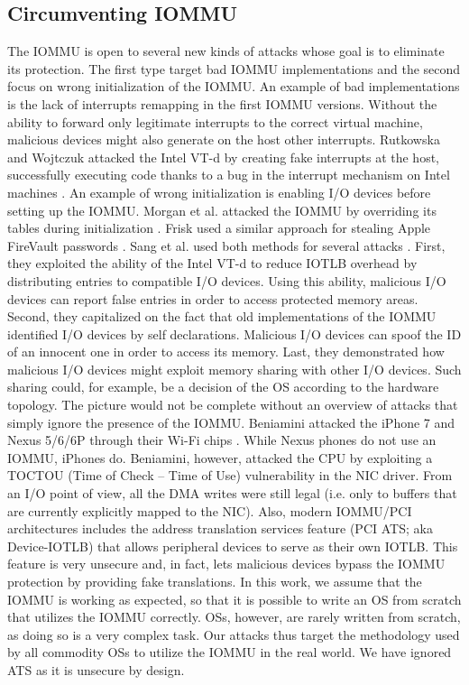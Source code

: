 \subsection{Circumventing IOMMU}
The IOMMU is open to several new kinds of attacks whose goal is to eliminate its protection. The first type target bad IOMMU implementations and the second focus on wrong initialization of the IOMMU. An example of bad implementations is the lack of interrupts remapping in the first IOMMU versions. Without the ability to forward only legitimate interrupts to the correct virtual machine, malicious devices might also generate on the host other interrupts. Rutkowska and Wojtczuk attacked the Intel VT-d by creating fake interrupts at the host, successfully executing code thanks to a bug in the interrupt mechanism on Intel machines \cite{WR11}. An example of wrong initialization is enabling I/O devices before setting up the IOMMU. Morgan et al. attacked the IOMMU by overriding its tables during initialization \cite{MANK16}. Frisk used a similar approach for stealing Apple FireVault passwords \cite{Cim16}. Sang et al. used both methods for several attacks \cite{SLND10}. First, they exploited the ability of the Intel VT-d to reduce IOTLB overhead by distributing entries to compatible I/O devices. Using this ability, malicious I/O devices can report false entries in order to access protected memory areas. Second, they capitalized on the fact that old implementations of the IOMMU identified I/O devices by self declarations. Malicious I/O devices can spoof the ID of an innocent one in order to access its memory. Last, they demonstrated how malicious I/O devices might exploit memory sharing with other I/O devices. Such sharing could, for example, be a decision of the OS according to the hardware topology. The picture would not be complete without an overview of attacks that simply ignore the presence of the IOMMU. Beniamini attacked the iPhone 7 and Nexus 5/6/6P through their Wi-Fi chips \cite{Ben17a, Ben17b}. While Nexus phones do not use an IOMMU, iPhones do. Beniamini, however, attacked the CPU by exploiting a TOCTOU (Time of Check – Time of Use) vulnerability in the NIC driver. From an I/O point of view, all the DMA writes were still legal (i.e. only to buffers that are currently explicitly mapped to the NIC). Also, modern IOMMU/PCI architectures includes the address translation services feature (PCI ATS; aka Device-IOTLB) that allows peripheral devices to serve as their own IOTLB. This feature is very unsecure and, in fact, lets malicious devices bypass the IOMMU protection by providing fake translations. In this work, we assume that the IOMMU is working as expected, so that it is possible to write an OS from scratch that utilizes the IOMMU correctly. OSs, however, are rarely written from scratch, as doing so is a very complex task. Our attacks thus target the methodology used by all commodity OSs to utilize the IOMMU in the real world. We have ignored ATS as it is unsecure by design.

